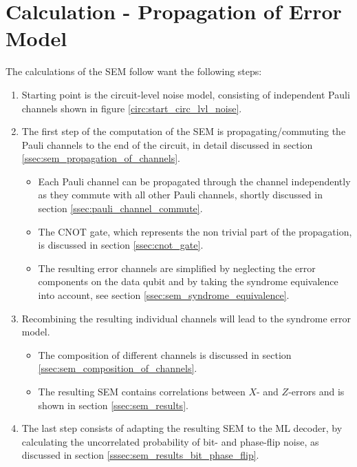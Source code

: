
\section{Calculation - Propagation of Error Model}\label{sec:sem_propagation}

The calculations of the SEM follow want the following steps:
\begin{enumerate}
    \item Starting point is the circuit-level noise model, consisting of independent Pauli channels shown in figure \ref{circ:start_circ_lvl_noise}. 
    \item The first step of the computation of the SEM is propagating/commuting the Pauli channels to the end of the circuit, in detail discussed in section \ref{ssec:sem_propagation_of_channels}.
    \begin{itemize}
        \item Each Pauli channel can be propagated through the channel independently as they commute with all other Pauli channels, shortly discussed in section \ref{ssec:pauli_channel_commute}.
        \item The CNOT gate, which represents the non trivial part of the propagation, is discussed in section \ref{ssec:cnot_gate}.
        \item The resulting error channels are simplified by neglecting the error components on the data qubit and by taking the syndrome equivalence into account, see section \ref{ssec:sem_syndrome_equivalence}. 
    \end{itemize}
    \item Recombining the resulting individual channels will lead to the syndrome error model. 
    \begin{itemize}
        \item The composition of different channels is discussed in section \ref{ssec:sem_composition_of_channels}. 
        \item The resulting SEM contains correlations between $X$- and $Z$-errors and is shown in section \ref{ssec:sem_results}.
    \end{itemize}
    \item The last step consists of adapting the resulting SEM to the ML decoder, by calculating the uncorrelated probability of bit- and phase-flip noise, as discussed in section \ref{sssec:sem_results_bit_phase_flip}. 
\end{enumerate}

